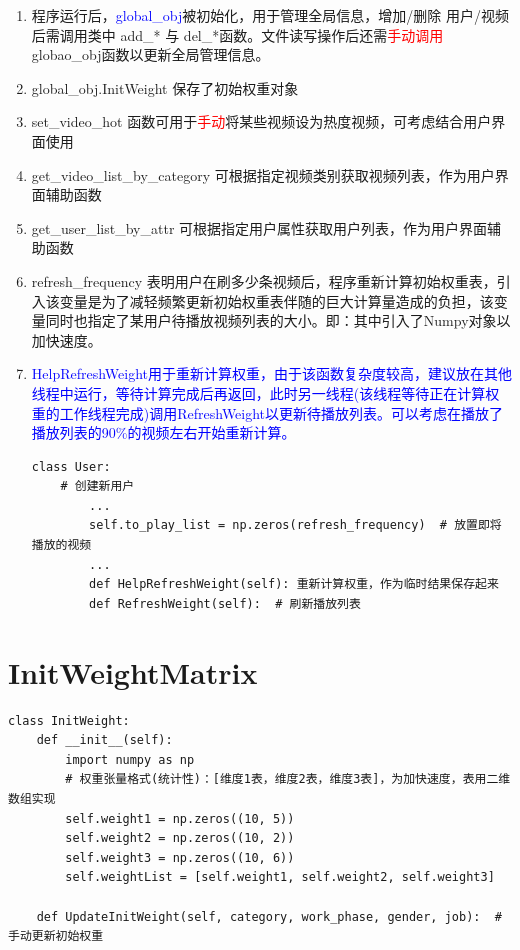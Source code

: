 \documentclass{article}
\begin{document}
\begin{enumerate}
    \item 程序运行后，\textcolor{blue}{global\_obj}被初始化，用于管理全局信息，增加/删除 用户/视频 后需调用类中 add\_* 与 del\_*函数。文件读写操作后还需\textcolor{red}{手动调用}globao\_obj函数以更新全局管理信息。
    \item global\_obj.InitWeight 保存了初始权重对象
    \item set\_video\_hot 函数可用于\textcolor{red}{手动}将某些视频设为热度视频，可考虑结合用户界面使用
    \item get\_video\_list\_by\_category 可根据指定视频类别获取视频列表，作为用户界面辅助函数
    \item get\_user\_list\_by\_attr 可根据指定用户属性获取用户列表，作为用户界面辅助函数
    \item refresh\_frequency 表明用户在刷多少条视频后，程序重新计算初始权重表，引入该变量是为了减轻频繁更新初始权重表伴随的巨大计算量造成的负担，该变量同时也指定了某用户待播放视频列表的大小。即：其中引入了Numpy对象以加快速度。
    \item \textcolor{blue}{HelpRefreshWeight用于重新计算权重，由于该函数复杂度较高，建议放在其他线程中运行，等待计算完成后再返回，此时另一线程(该线程等待正在计算权重的工作线程完成)调用RefreshWeight以更新待播放列表。可以考虑在播放了播放列表的90\%的视频左右开始重新计算。}
    \begin{lstlisting}
class User:
    # 创建新用户
        ...
        self.to_play_list = np.zeros(refresh_frequency)  # 放置即将播放的视频
        ...
        def HelpRefreshWeight(self): 重新计算权重，作为临时结果保存起来
        def RefreshWeight(self):  # 刷新播放列表
    \end{lstlisting}
\end{enumerate}

\section{InitWeightMatrix}
\begin{lstlisting}
class InitWeight:
    def __init__(self):
        import numpy as np
        # 权重张量格式(统计性)：[维度1表，维度2表，维度3表]，为加快速度，表用二维数组实现
        self.weight1 = np.zeros((10, 5))
        self.weight2 = np.zeros((10, 2))
        self.weight3 = np.zeros((10, 6))
        self.weightList = [self.weight1, self.weight2, self.weight3]

    def UpdateInitWeight(self, category, work_phase, gender, job):  # 手动更新初始权重
\end{lstlisting}
\end{document}
